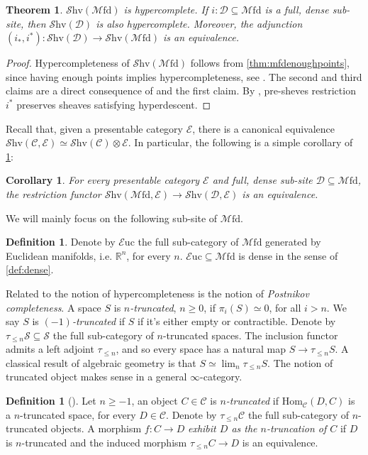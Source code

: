 \documentclass[10pt]{amsart}
\newcommand{\C}{\mathscr{C}}
\newcommand{\D}{\mathscr{D}}
\newcommand{\E}{\mathscr{E}}
\newcommand{\s}{\mathscr{S}}
\newcommand{\bR}{\mathbb{R}}
\newcommand{\Hom}{\mathrm{Hom}}
\newcommand{\Euc}{\mathscr{E}\mathrm{uc}}
\newcommand{\Mfd}{\mathscr{M}\mathrm{fd}}
\newcommand{\Shv}{\mathscr{S}\mathrm{hv}}
\newtheorem{theorem}[equation]{Theorem}
\newtheorem{corollary}[equation]{Corollary}
\theoremstyle{definition}
\newtheorem{definition}[equation]{Definition}
\theoremstyle{remark}
\numberwithin{equation}{section}
\begin{document}
\begin{theorem}\label{thm:mfdhypercomplete}
	$\Shv(\Mfd)$ is hypercomplete. If $i:\D\subseteq\Mfd$ is a full, dense sub-site, then $\Shv(\D)$ is also hypercomplete. Moreover, the adjunction $(i_*,i^*):\Shv(\D)\to\Shv(\Mfd)$ is an equivalence.
\end{theorem}
\begin{proof}
	Hypercompleteness of $\Shv(\Mfd)$ follows from \cref{thm:mfdenoughpoints}, since having enough points implies hypercompleteness, see \cite[Example 3.11.10]{barwick2020exodromy}. The second and third claims are a direct consequence of \cite[Corollary 3.12.13]{barwick2020exodromy} and the first claim. By \cite[Proposition 3.12.11]{barwick2020exodromy}, pre-sheves restriction $i^*$ preserves sheaves satisfying hyperdescent. 
\end{proof}Recall that, given a presentable category $\E$, there is a canonical equivalence $\Shv(\C,\E)\simeq\Shv(\C)\otimes\E$. In particular, the following is a simple corollary of \cref{thm:mfdhypercomplete}:
\begin{corollary}\label{cor:equivalence}
For every presentable category $\E$ and full, dense sub-site $\D\subseteq\Mfd$, the restriction functor $\Shv(\Mfd,\E)\to\Shv(\D,\E)$ is an equivalence. 	
\end{corollary}
We will mainly focus on the following sub-site of $\Mfd$.
\begin{definition}
	Denote by $\Euc$ the full sub-category of $\Mfd$ generated by Euclidean manifolds, i.e. $\bR^n$, for every $n$. $\Euc\subseteq\Mfd$ is dense in the sense of \cref{def:dense}. 
\end{definition}
Related to the notion of hypercompleteness is the notion of \emph{Postnikov completeness}. A space $S$ is \emph{$n$-truncated}, $n\geq0$, if $\pi_i(S)\simeq0$, for all $i>n$. We say $S$ is \emph{$(-1)$-truncated} if $S$ if it's either empty or contractible. Denote by $\tau_{\leq n}\s\subseteq\s$ the full sub-category of $n$-truncated spaces. The inclusion functor admits a left adjoint $\tau_{\leq n}$, and so every space has a natural map $S\to\tau_{\leq n}S$. A classical result of algebraic geometry is that $S\simeq\lim_n\tau_{\leq n}S$. The notion of truncated object makes sense in a general $\infty$-category. 
\begin{definition}[{\cite[Definition 5.5.6.1]{lurie2009htt}}]
	Let $n\geq-1$, an object $C\in\C$ is $n$\emph{-truncated} if $\Hom_\C(D,C)$ is a $n$-truncated space, for every $D\in\C$. Denote by $\tau_{\leq n}\C$ the full sub-category of $n$-truncated objects. A morphism $f:C\to D$ \emph{exhibit $D$ as the $n$-truncation of $C$} if $D$ is $n$-truncated and the induced morphism $\tau_{\leq n}C\to D$ is an equivalence. 
\end{definition}
\end{document}
